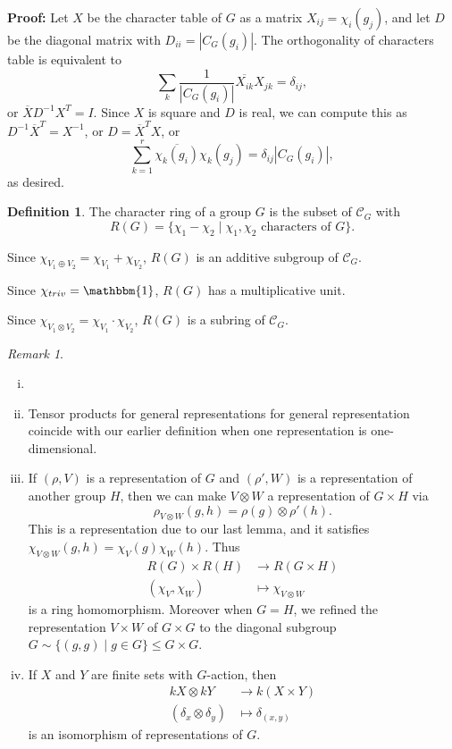 \documentclass[12pt]{article}
\theoremstyle{definition}
\newtheorem{definition}{Definition}[section]
\theoremstyle{remark}
\newtheorem*{remark}{Remark}
\begin{document}
\begin{adjustbox}{minipage = \columnwidth - 25.5pt, margin=1em, frame=1pt, margin=0em}
	\textbf{Proof:} Let $X$ be the character table of $G$ as a matrix $X_{ij} = \chi_i(g_j)$, and let $D$ be the diagonal matrix with $D_{ii} = |C_G(g_i)|$. The orthogonality of characters table is equivalent to
	\[
		\sum_{k} \frac{1}{|C_G(g_i)|} \overline{X_{ik}}X_{jk} = \delta_{ij}
	,\]
	or $\overline{X} D^{-1} X^{T} = I$. Since $X$ is square and $D$ is real, we can compute this as $D^{-1} \overline{X}^{T} = X^{-1}$, or $D = \overline{X}^{T} X$, or
	\[
		\sum_{k = 1}^{r} \overline{\chi_k(g_i)} \chi_k(g_j) = \delta_{ij} |C_G(g_i)|
	,\]
	as desired.
\end{adjustbox}

\newpage

\begin{definition}
	The character ring of a group $G$ is the subset of $\mathcal{C}_G$ with
	\[
		R(G) = \{\chi_1 - \chi_2 \mid \chi_1, \chi_2 \text{ characters of } G\}
	.\]
\end{definition}

Since $\chi_{V_1 \oplus V_2} = \chi_{V_1} + \chi_{V_2}$, $R(G)$ is an additive subgroup of $\mathcal{C}_G$.

Since $\chi_{triv} = \mathbbm{1}$, $R(G)$ has a multiplicative unit.

Since $\chi_{V_1 \otimes V_2} = \chi_{V_1} \cdot \chi_{V_2}$, $R(G)$ is a subring of $\mathcal{C}_G$.

\begin{remark}
	\begin{enumerate}[(i)]
		\item[]
		\item Tensor products for general representations for general representation coincide with our earlier definition when one representation is one-dimensional.
		\item If $(\rho, V)$ is a representation of $G$ and $(\rho', W)$ is a representation of another group $H$, then we can make $V \otimes W$ a representation of $G \times H$ via
			\[
				\rho_{V \otimes W}(g, h) = \rho(g) \otimes \rho'(h)
			.\]
			This is a representation due to our last lemma, and it satisfies $\chi_{V \otimes W}(g, h) = \chi_V(g) \chi_W(h)$. Thus
			\begin{align*}
				R(G) \times R(H) &\to R(G \times H) \\
				(\chi_V, \chi_W) &\mapsto \chi_{V \otimes W}
			\end{align*}
			is a ring homomorphism. Moreover when $G = H$, we refined the representation $V \times W$ of $G \times G$ to the diagonal subgroup $G \sim \{(g, g) \mid g\in G\} \leq G \times G$.
		\item If $X$ and $Y$ are finite sets with $G$-action, then
			\begin{align*}
				kX \otimes kY &\to k(X \times Y) \\
				(\delta_x \otimes \delta_y) &\mapsto \delta_{(x, y)}
			\end{align*}
			is an isomorphism of representations of $G$.
	\end{enumerate}
\end{remark}
\end{document}
